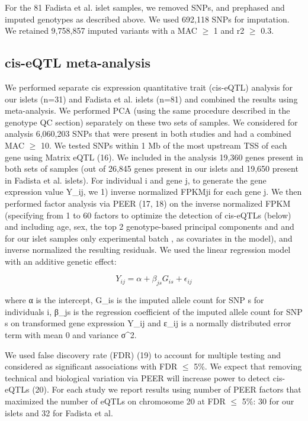 For the 81 Fadista et al. islet samples, we removed SNPs, and prephased and imputed genotypes as described above. We used 692,118 SNPs for imputation. We retained 9,758,857 imputed variants with a MAC $\geq$ 1 and r2 $\geq$ 0.3.

\subsection{cis-eQTL meta-analysis}
We performed separate cis expression quantitative trait (cis-eQTL) analysis for our islets (n=31) and Fadista et al. islets (n=81) and combined the results using meta-analysis. We performed PCA (using the same procedure described in the genotype QC section) separately on these two sets of samples.  We considered for analysis 6,060,203 SNPs that were present in both studies and had a combined MAC $\geq$ 10. We tested SNPs within 1 Mb of the most upstream TSS of each gene using Matrix eQTL (16). We included in the analysis 19,360 genes present in both sets of samples (out of 26,845 genes present in our islets and 19,650 present in Fadista et al. islets). For individual i and gene j, to generate the gene expression value Y_ij, we 1) inverse normalized FPKMji for each gene j. We then performed factor analysis via PEER (17, 18) on the inverse normalized FPKM (specifying from 1 to 60 factors to optimize the detection of cis-eQTLs (below) and including age, sex, the top 2 genotype-based principal components and and for our islet samples only experimental batch , as covariates in the model), and inverse normalized the resulting residuals. We used the linear regression model with an additive genetic effect: 

\[Y_{ij} = \alpha + \beta_{js}G_{is} + \epsilon_{ij} \]

where α is the intercept, G_is is the imputed allele count for SNP s for individuals i, β_js is the regression coefficient of the imputed allele count for SNP s on transformed gene expression Y_ij and ε_ij is a normally distributed error term with mean 0 and variance σ^2.
 
We used false discovery rate (FDR) (19) to account for multiple testing and considered as significant associations with FDR $\leq$ 5\%. We expect that removing technical and biological variation via PEER will increase power to detect cis-eQTLs (20). For each study we report results using number of PEER factors that maximized the number of eQTLs on chromosome 20 at FDR $\leq$ 5\%: 30 for our islets and 32 for Fadista et al.

